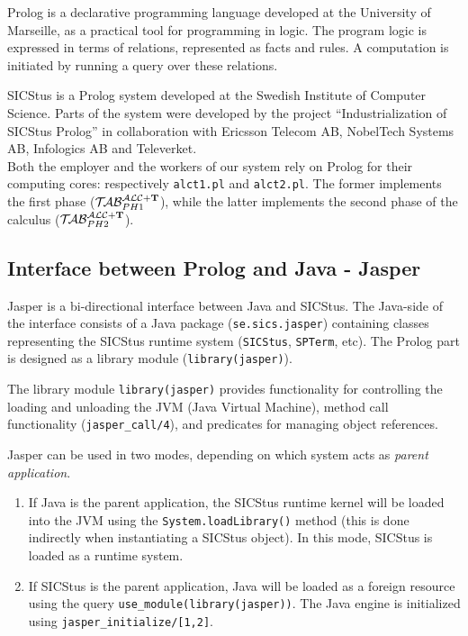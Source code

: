 \documentclass[a4paper, 11pt, oneside]{duthesis}
\newcommand{\tip}{{\bf T}}
\newcommand{\primo}{\mathrel{{\mathcal{T}\!\mathcal{AB}}}_{PH 1}^{\mathcal{ALC}+\mbox{\scriptsize $\tip$}}}
\newcommand{\secondo}{\mathrel{{\mathcal{T}\!\mathcal{AB}}}_{PH 2}^{\mathcal{ALC}+\mbox{\scriptsize $\tip$}}}
\begin{document}
Prolog is a declarative programming language developed at the University of Marseille, as a practical tool for programming in logic. The program logic is expressed in terms of relations, represented as facts and rules. A computation is initiated by running a query over these relations\cite{Lloyd:1984:FLP:2214}.

SICStus is a Prolog system developed at the Swedish Institute of Computer Science. Parts of the system were developed by the project “Industrialization of SICStus Prolog” in collaboration with Ericsson Telecom AB, NobelTech Systems AB, Infologics AB and Televerket\cite{sicstus_intro}.\\

Both the employer and the workers of our system rely on Prolog for their computing cores: respectively \verb$alct1.pl$ and \verb$alct2.pl$. The former implements the first phase ($\primo$), while the latter implements the second phase of the calculus ($\secondo$).


\subsection{Interface between Prolog and Java - Jasper}\label{ssec_jasper}

Jasper is a bi-directional interface between Java and SICStus. The Java-side of the interface consists of a Java package (\verb$se.sics.jasper$) containing classes representing the SICStus runtime system (\verb$SICStus$, \verb$SPTerm$, etc). The Prolog part is designed as a library module (\verb$library(jasper)$).

The library module \verb$library(jasper)$  provides functionality for controlling the loading and unloading the JVM (Java Virtual Machine), method call functionality (\verb$jasper_call/4$), and predicates for managing object references.

Jasper can be used in two modes, depending on which system acts as \emph{parent application}.
\begin{enumerate}
\item If Java is the parent application, the SICStus runtime kernel will be loaded into the JVM using the \verb$System.loadLibrary()$ method (this is done indirectly when instantiating a SICStus object). In this mode, SICStus is loaded as a runtime system.

\item If SICStus is the parent application, Java will be loaded as a foreign resource using the query \verb$use_module(library(jasper))$. The Java engine is initialized using \verb$jasper_initialize/[1,2]$\cite{sicstus_jasper}.\\
\end{enumerate}
\end{document}
